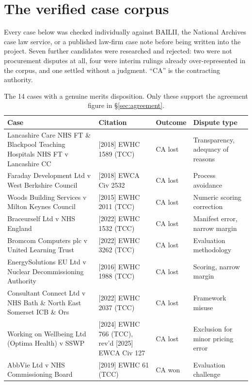 \chapter{The verified case corpus}
\label{app:corpus}

Every case below was checked individually against BAILII, the National Archives
case law service, or a published law-firm case note before being written into the
project. Seven further candidates were researched and rejected: two were not
procurement disputes at all, four were interim rulings already over-represented in
the corpus, and one settled without a judgment. ``CA'' is the contracting
authority.

\begin{table}[htbp]
\centering
\scriptsize
\caption[Merits-disposition cases]{The 14 cases with a genuine merits disposition.
Only these support the agreement figure in \S\ref{sec:agreement}.}
\label{tab:corpus}
\begin{tabular}{|p{5.3cm}|p{3.0cm}|p{1.3cm}|p{3.5cm}|}
\hline
\textbf{Case} & \textbf{Citation} & \textbf{Outcome} & \textbf{Dispute type} \\
\hline
Lancashire Care NHS FT \& Blackpool Teaching Hospitals NHS FT v Lancashire CC &
  [2018] EWHC 1589 (TCC) & CA lost & Transparency, adequacy of reasons \\
\hline
Faraday Development Ltd v West Berkshire Council &
  [2018] EWCA Civ 2532 & CA lost & Process avoidance \\
\hline
Woods Building Services v Milton Keynes Council &
  [2015] EWHC 2011 (TCC) & CA lost & Numeric scoring correction \\
\hline
Braceurself Ltd v NHS England &
  [2022] EWHC 1532 (TCC) & CA lost & Manifest error, narrow margin \\
\hline
Bromcom Computers plc v United Learning Trust &
  [2022] EWHC 3262 (TCC) & CA lost & Evaluation methodology \\
\hline
EnergySolutions EU Ltd v Nuclear Decommissioning Authority &
  [2016] EWHC 1988 (TCC) & CA lost & Scoring, narrow margin \\
\hline
Consultant Connect Ltd v NHS Bath \& North East Somerset ICB \& Ors &
  [2022] EWHC 2037 (TCC) & CA lost & Framework misuse \\
\hline
Working on Wellbeing Ltd (Optima Health) v SSWP &
  [2024] EWHC 766 (TCC), rev'd [2025] EWCA Civ 127 & CA lost & Exclusion for minor pricing error \\
\hline
AbbVie Ltd v NHS Commissioning Board &
  [2019] EWHC 61 (TCC) & CA won & Evaluation challenge \\

\end{tabular}
\end{table}
